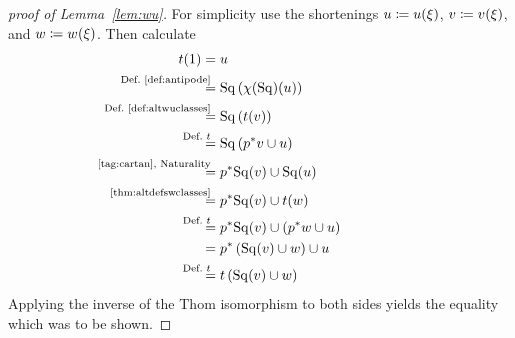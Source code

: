 \begin{proof}[proof of Lemma~\autoref{lem:wu}]
  For simplicity use the shortenings
  $u\coloneqq {u}(\xi)$,
  $v\coloneqq {v_{}}(\xi)$, and
  $w\coloneqq {w_{}}(\xi)$.
  Then calculate
  \begin{align*}
    \thomiso(1)
    &= \U
    \\
    &\equalsby{Def.~\autoref{def:antipode}}
      \SQ\left(\antipode(\SQ)(\U)\right)
    \\
    &\equalsby{Def.~\autoref{def:altwuclasses}}
      \SQ\left(\thomiso(\vu)\right)
    \\
    &\equalsby{Def.~$\thomiso$}
      \SQ\left(\pb p\vu \cup \U\right)
    \\
    &\equalsby{\ref{tag:cartan}, Naturality}
      \pb p\SQ(\vu) \cup \SQ(\U)
    \\
    &\equalsby{\autoref{thm:altdefswclasses}}
      \pb p\SQ(\vu) \cup \thomiso(\Ws)
    \\
    &\equalsby{Def.~$\thomiso$}
      \pb p\SQ(\vu) \cup \left(\pb p \Ws \cup \U\right)
    \\
    &=
      \pb p\left(\SQ(\vu) \cup \Ws\right) \cup \U
    \\
    &\equalsby{Def.~$\thomiso$}
      \thomiso\left(\SQ(\vu) \cup \Ws\right)
  \end{align*}
  Applying the inverse of the Thom isomorphism to both sides
  yields the equality which was to be shown.
\end{proof}

